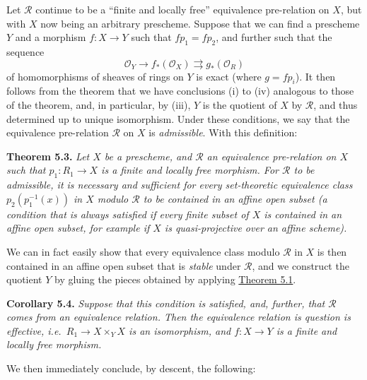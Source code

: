 \documentclass{article}
\newenvironment{itenv}[1]
  {\phantomsection\par\smallskip\noindent\textbf{#1.}\itshape}
  {\par\smallskip}
\newcommand{\oldpage}[1]{\marginpar{\footnotesize$\Big\vert$ \textit{p.~#1}}}
\theoremstyle{definition}
\theoremstyle{definition}
\theoremstyle{definition}
\theoremstyle{definition}
\theoremstyle{remark}
\begin{document}
Let \({\mathcal{R}}\) continue to be a ``finite and locally free'' equivalence pre-relation on \(X\), but with \(X\) now being an arbitrary prescheme.
Suppose that we can find a prescheme \(Y\) and a morphism \(f\colon X\to Y\) such that \(fp_1=fp_2\), and further such that the sequence
\[
  {\mathcal{O}}_Y \to f_*({\mathcal{O}}_X) \rightrightarrows g_*({\mathcal{O}}_R)
\]
of homomorphisms of sheaves of rings on \(Y\) is exact (where \(g=fp_i\)).
It then follows from the theorem that we have conclusions (i) to (iv) analogous to those of the theorem, and, in particular, by (iii), \(Y\) is the quotient of \(X\) by \({\mathcal{R}}\), and thus determined up to unique isomorphism.
Under these conditions, we say that the equivalence pre-relation \({\mathcal{R}}\) on \(X\) is \emph{admissible}.
With this definition:

\leavevmode{}%
\begin{itenv}{Theorem 5.3}
Let \(X\) be a prescheme, and \({\mathcal{R}}\) an equivalence pre-relation on \(X\) such that \(p_1\colon R_1\to X\) is a finite and locally free morphism.
For \({\mathcal{R}}\) to be admissible, it is necessary and sufficient for every set-theoretic equivalence class \(p_2(p_1^{-1}(x))\) in \(X\) modulo \({\mathcal{R}}\) to be contained in an affine open subset (a condition that is always satisfied if every finite subset of \(X\) is contained in an affine open subset, for example if \(X\) is quasi-projective over an affine scheme).

\end{itenv}

We can in fact easily show that every equivalence class modulo \({\mathcal{R}}\) in \(X\) is then contained in an affine open subset that is \emph{stable} under \({\mathcal{R}}\), and we construct the quotient \(Y\) by gluing the pieces obtained by applying \protect\hyperlink{fga-3-iii-theorem-5.1}{Theorem 5.1}.

\leavevmode{}%
\begin{itenv}{Corollary 5.4}
\oldpage{212-14}Suppose that this condition is satisfied, and, further, that \({\mathcal{R}}\) comes from an equivalence relation.
Then the equivalence relation is question is effective, i.e.~\(R_1\to X\times_Y X\) is an isomorphism, and \(f\colon X\to Y\) is a finite and locally free morphism.

\end{itenv}

We then immediately conclude, by descent, the following:
\end{document}
